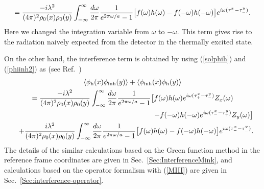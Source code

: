 \documentclass[aps,prd,preprintnumbers,nofootinbib,showpacs,11pt]{revtex4}%
\begin{document}
\begin{widetext}
\begin{multline}
  ={-i\lambda^2\over (4\pi)^2\rho_0(x)\rho_0(y)}
  \int _{-\infty}^{\infty}{d\omega\over2\pi}{1\over e^{2\pi\omega/a}-1}
\bigr[f(\omega)h(\omega)-f(-\omega)h(-\omega)\bigl]e^{i\omega(\tau_-^x-\tau_-^y)} .
\label{inhomogeneousterm}
\end{multline}
Here we changed the integration variable from $\omega$ to $-\omega$.
This term gives rise to the radiation naively expected from the detector
in the thermally excited state.

On the other hand, the interference term is obtained by using  (\ref{solphih}) and
 (\ref{phiinh2}) as (see Ref.~\cite{IYZ2013}) 
\begin{multline}
\langle\phi_{\rm h}(x)\phi_{\rm inh}(y)\rangle
+\langle\phi_{\rm inh}(x)\phi_{\rm h}(y)\rangle
\\
= {-i\lambda^2\over (4\pi)^2\rho_0(x)\rho_0(y)}
  \int _{-\infty}^{\infty}{d\omega\over2\pi}{1
\over e^{2\pi\omega/a}-1}
\bigr[f(\omega)h(\omega)e^{i\omega(\tau_+^x-\tau_-^y)}Z_x(\omega) \\
\qquad\qquad\qquad\qquad\qquad\qquad\qquad\qquad\qquad\qquad -f(-\omega)h(-\omega)e^{i\omega(\tau_-^x-\tau_+^y)}Z_y(\omega)\bigl]
\\
\quad +{i\lambda^2\over (4\pi)^2\rho_0(x)\rho_0(y)}
  \int _{-\infty}^{\infty}{d\omega\over2\pi}{1\over e^{2\pi\omega/a}-1}
\bigr[f(\omega)h(\omega)-f(-\omega)h(-\omega)\bigl]e^{i\omega(\tau_-^x-\tau_-^y)} .
\label{interferenceall}
\end{multline}
The details of the similar calculations based on the Green function method in the 
reference frame coordinates
are given in Sec.~\ref{Sec:InterferenceMink}, and calculations based on the operator formalism
with (\ref{MIII}) are given in Sec.~\ref{Sec:interference-operator}. 


\end{widetext}
\end{document}
